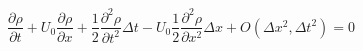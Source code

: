 \documentclass{mc2015}
\begin{document}
    \begin{equation}
    	\label{eq:MEA_p1}
    	 \frac{\partial \rho}{\partial t}  +  U_{0} \frac{\partial \rho}{\partial x} + 
    	 \frac{1}{2} \frac{\partial^2 \rho}{\partial t^2} \Delta t -
    	   U_{0}  \frac{1}{2} \frac{\partial^2 \rho}{\partial x^2} \Delta x  
    	   + O(\Delta x^{2},\Delta t^{2}) = 0 
    \end{equation} \linebreak
    
%    
%    
%    
%    
%    
\end{document}
